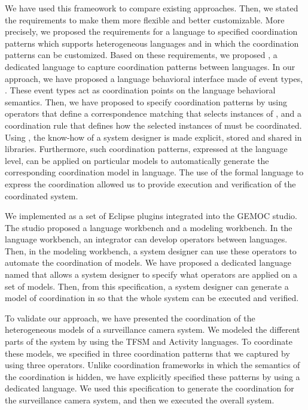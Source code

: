 We have used this frameowork to compare existing approaches. Then, we stated the requirements to make them more flexible and better customizable. More precisely, we proposed the requirements for a language to specified coordination patterns which supports heterogeneous languages and in which the coordination patterns can be customized. Based on these requirements, we proposed \bcool, a dedicated language to capture coordination patterns between languages. In our approach, we have proposed a language behavioral interface made of event types, \ie \dse. These event types act as coordination points on the language behavioral semantics. Then, we have proposed to specify coordination patterns by using operators that define a correspondence matching that selects instances of \dse, and a coordination rule that defines how the selected instances of \dse must be coordinated. Using \bcool, the know-how of a system designer is made explicit, stored and shared in libraries. Furthermore, such coordination patterns, expressed at the language level, can be applied on particular models to automatically generate the corresponding coordination model in \ccsl language. The use of the formal \ccsl language to express the coordination allowed us to provide execution and verification of the coordinated system.
	
We implemented \bcool as a set of Eclipse plugins integrated into the GEMOC studio. The studio proposed a language workbench and a modeling workbench. In the language workbench, an integrator can develop operators between languages. Then, in the modeling workbench, a system designer can use these operators to automate the coordination of models. We have proposed a dedicated language named \bflow that allows a system designer to specify what operators are applied on a set of models. Then, from this specification, a system designer can generate a model of coordination in \ccsl so that the whole system can be executed and verified.  
	
To validate our approach, we have presented the coordination of the heterogeneous models of a surveillance camera system. We modeled the different parts of the system by using the TFSM and Activity languages. To coordinate these models, we specified in \bcool three coordination patterns that we captured by using three operators. Unlike coordination frameworks in which the semantics of the coordination is hidden, we have explicitly specified these patterns by using a dedicated language. We used this specification to generate the coordination for the surveillance camera system, and then we executed the overall system.


